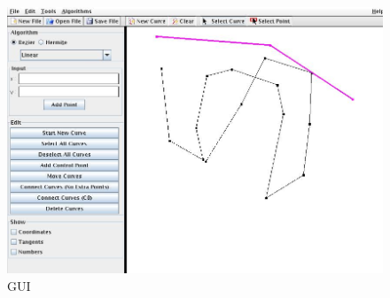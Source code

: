 \documentclass[a4paper,11pt,oneside, titlepage]{article}
\begin{document}
\begin{figure}[htbp]
\centering
\includegraphics[scale=0.4]{./screenies/hooverCurve.jpg}
\caption{GUI}\label{GUI}
\end{figure}
\end{document}
